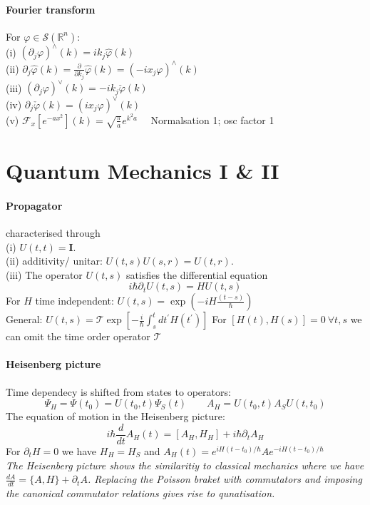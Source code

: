 
\paragraph{Fourier transform } For $\varphi \in \mathscr{S}\left(\mathbb{R}^n\right)$:\\
(i) $\left(\partial_j \varphi\right)^{\wedge}(k)=i k_j \hat{\varphi}(k)$\\
(ii) $\partial_j \hat{\varphi}(k)=\frac{\partial}{\partial k_j} \hat{\varphi}(k)=\left(-i x_j \varphi\right)^{\wedge}(k)$\\
(iii) $\left(\partial_j \varphi\right)^{\vee}(k)=-i k_j \check{\varphi}(k)$\\
(iv) $\partial_j \check{\varphi}(k)=\left(i x_j \varphi\right)^{\vee}(k)$\\
(v) $\mathcal{F}_x\left[e^{-a x^2}\right](k)=\sqrt{\frac{\pi}{a}} e^{k^2 a} \quad $ Normalsation 1; osc factor 1


\section{Quantum Mechanics I \& II}

\paragraph{Propagator} characterised through \\
(i) $U(t, t)=\mathbf{I}$.\\
(ii) additivity/ unitar: $U(t, s) U(s, r)=U(t, r)$.\\
(iii) The operator $U(t, s)$ satisfies the differential equation
$$
i \hbar \partial_t U(t, s)=H U(t, s)
$$
For $H$ time independent: $U(t, s)=\exp \left(-i H \frac{(t-s)}{\hbar}\right)$\\
General: $U(t, s)=\mathcal{T} \exp \left[-\frac{i}{\hbar} \int_s^t d t^{\prime} H\left(t^{\prime}\right)\right]$
For $[H(t),H(s)]=0 \ \forall t,s$ we can omit the time order operator $\mathcal{T}$

\paragraph{Heisenberg picture} Time dependecy is shifted from states to operators:\\
$$\Psi_H= \Psi(t_0) = U\left(t_0, t\right) \Psi_S(t) \quad \quad A_H=U\left(t_0, t\right) A_S U\left(t, t_0\right)$$
The equation of motion in the Heisenberg picture: 
$$i \hbar \frac{d}{d t} A_H(t) = \left[A_H, H_H\right]+i \hbar \partial_t A_H$$
For $\partial_t H=0$ we have $H_H=H_S$ and $A_H(t)=e^{i H\left(t-t_0\right) / \hbar} A e^{-i H\left(t-t_0\right) / \hbar}$\\
\emph{The Heisenberg picture shows the similaritiy to classical mechanics where we have $\frac{d A}{d t}=\{A, H\}+\partial_t A$.
Replacing the Poisson braket with commutators and imposing the canonical commutator relations gives rise to qunatisation. }

